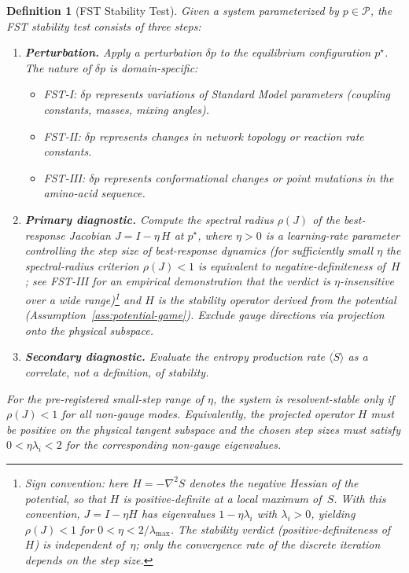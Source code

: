 \documentclass[12pt,a4paper]{article}
\newtheorem{definition}{Definition}
\theoremstyle{remark}
\begin{document}
\begin{definition}[FST Stability Test]\label{def:stability-test}
Given a system parameterized by $p \in \mathcal{P}$, the \emph{FST stability
test} consists of three steps:
\begin{enumerate}
  \item \textbf{Perturbation.} Apply a perturbation $\delta p$ to the
        equilibrium configuration $p^\star$.  The nature of $\delta p$ is
        domain-specific:
        \begin{itemize}
          \item FST-I: $\delta p$ represents variations of Standard Model
                parameters (coupling constants, masses, mixing angles).
          \item FST-II: $\delta p$ represents changes in network topology
                or reaction rate constants.
          \item FST-III: $\delta p$ represents conformational changes or
                point mutations in the amino-acid sequence.
        \end{itemize}
  \item \textbf{Primary diagnostic.} Compute the spectral radius
        $\rho(J)$ of the best-response Jacobian
        $J = I - \eta\, H$ at $p^\star$, where $\eta > 0$ is a learning-rate parameter controlling the step size of best-response dynamics (for sufficiently small $\eta$ the spectral-radius criterion $\rho(J)<1$ is equivalent to negative-definiteness of~$H$; see FST-III for an empirical demonstration that the verdict is $\eta$-insensitive over a wide range)\footnote{Sign convention: here $H = -\nabla^2 S$ denotes the \emph{negative} Hessian of the potential, so that $H$ is positive-definite at a local maximum of~$S$. With this convention, $J = I - \eta H$ has eigenvalues $1 - \eta \lambda_i$ with $\lambda_i > 0$, yielding $\rho(J) < 1$ for $0 < \eta < 2/\lambda_{\max}$. The stability verdict (positive-definiteness of~$H$) is independent of~$\eta$; only the convergence rate of the discrete iteration depends on the step size.} and $H$ is the
        stability operator derived from the potential
        (Assumption~\ref{ass:potential-game}).  Exclude gauge directions
        via projection onto the physical subspace.
  \item \textbf{Secondary diagnostic.} Evaluate the entropy production
        rate $\langle\dot{S}\rangle$ as a \emph{correlate}, not a
        definition, of stability.
\end{enumerate}
For the pre-registered small-step range of $\eta$, the system is
\emph{resolvent-stable} only if $\rho(J) < 1$ for all non-gauge modes.
Equivalently, the projected operator $H$ must be positive on the physical
tangent subspace and the chosen step sizes must satisfy
$0<\eta\lambda_i<2$ for the corresponding non-gauge eigenvalues.
\end{definition}
\end{document}
